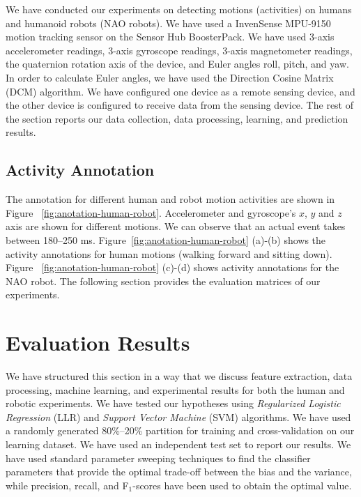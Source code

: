 \documentclass[letterpaper]{article}
\begin{document}
\begin{sloppy}
We have conducted our experiments on detecting motions (activities) on 
humans and humanoid robots (NAO robots). We have used a InvenSense MPU-9150 
motion tracking sensor on the Sensor Hub BoosterPack. 
% 
% 
We have used 3-axis accelerometer readings, 3-axis gyroscope readings, 3-axis magnetometer readings, 
the quaternion rotation axis of the device, and Euler angles roll, pitch, and yaw.  In order to 
calculate Euler angles, we have used the Direction Cosine Matrix (DCM) algorithm. We have configured 
one device as a remote sensing device, and the other device is configured to receive data from the 
sensing device. The rest of the  section reports our data collection, data processing, learning, 
and prediction results.


\subsection{Activity Annotation}

The annotation for different human and robot motion activities are shown in 
Figure {~\ref{fig:anotation-human-robot}}. 
Accelerometer and gyroscope's $x$, $y$ and $z$ axis are shown for different motions. We can observe 
that an 
actual event takes between 180--250 ms. Figure{~\ref{fig:anotation-human-robot}} (a)-(b) shows the 
activity annotations for human motions (walking forward and sitting down). 
Figure {~\ref{fig:anotation-human-robot}}
(c)-(d) shows activity annotations for the NAO robot. The following section provides the evaluation 
matrices of our experiments. 


\section{Evaluation Results}
We have structured this section in a way that we discuss feature extraction, data processing, 
machine learning, and experimental results for both the human and robotic experiments. We have 
tested our hypotheses using  {\em Regularized Logistic Regression} (LLR) and {\em Support 
Vector Machine} (SVM) algorithms. We have used a randomly generated 80\%--20\% partition for 
training and cross-validation on our learning dataset. We have used an independent test set to 
report our results. We have used standard parameter sweeping techniques to find the classifier 
parameters that provide the optimal trade-off between the bias and the variance, while precision, 
recall, and F$_1$-scores have been used to obtain the optimal value. 


\end{sloppy}
\end{document}
